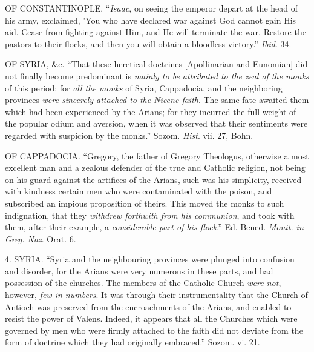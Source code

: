 OF
CONSTANTINOPLE.
``\emph{Isaac}, on seeing the emperor depart at the head of his army,
exclaimed, 'You who have declared war against God cannot gain His aid.
Cease from fighting against Him, and He will terminate the war. Restore
the pastors to their flocks, and then you will obtain a bloodless
victory.'' \emph{Ibid}. 34.

OF
SYRIA,
\&c. ``That these heretical doctrines [Apollinarian and Eunomian] did
not finally become predominant is \emph{mainly to be attributed to the zeal
of the monks} of this period; for \emph{all the monks} of Syria,
Cappadocia, and the neighboring provinces \emph{were sincerely attached to
the Nicene faith}. The same fate awaited them which had been
experienced by the Arians; for they incurred the full weight of the
popular odium and aversion, when it was observed that their sentiments
were regarded with suspicion by the monks.'' Sozom. \emph{Hist}. vii. 27,
Bohn.

OF
CAPPADOCIA.
``Gregory, the father of Gregory Theologus, otherwise a most excellent
man and a zealous defender of the true and Catholic religion, not being
on his guard against the artifices of the Arians, such was his
simplicity, received with kindness certain men who were contaminated
with the poison, and subscribed an impious proposition of theirs. This
moved the monks to such indignation, that they \emph{withdrew forthwith
from his communion}, and took with them, after their example, a \emph{considerable
part of his flock}.'' Ed. Bened. \emph{Monit. in Greg. Naz}. Orat. 6.

4. SYRIA.
``Syria and the neighbouring provinces were plunged into confusion and
disorder, for the Arians were very numerous in these parts, and had
possession of the churches. The members of the Catholic Church \emph{were
not}, however, \emph{few in numbers}. It was through their
instrumentality that the Church of Antioch was preserved from the
encroachments of the Arians, and enabled to resist the power of Valens.
Indeed, it appears that all the Churches which were governed by men who
were firmly attached to the faith did not deviate from the form of
doctrine which they had originally embraced.'' Sozom. vi. 21.

